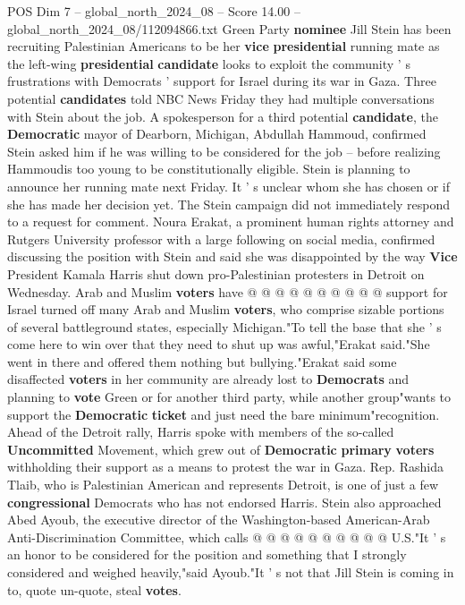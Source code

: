 \begin{textsample}{POS Dim 7 – global\_north\_2024\_08 – Score 14.00 – global\_north\_2024\_08/112094866.txt}  \label{ex:f7_pos_005}
Green Party \textbf{nominee} Jill Stein has been recruiting Palestinian Americans to be her \textbf{vice} \textbf{presidential} running mate as the left-wing \textbf{presidential} \textbf{candidate} looks to exploit the community ' s frustrations with Democrats ' support for Israel during its war in Gaza.
Three potential \textbf{candidates} told NBC News Friday they had multiple conversations with Stein about the job.
A spokesperson for a third potential \textbf{candidate}, the \textbf{Democratic} mayor of Dearborn, Michigan, Abdullah Hammoud, confirmed Stein asked him if he was willing to be considered for the job -- before realizing Hammoudis too young to be constitutionally eligible.
Stein is planning to announce her running mate next Friday.
It ' s unclear whom she has chosen or if she has made her decision yet.
The Stein campaign did not immediately respond to a request for comment.
Noura Erakat, a prominent human rights attorney and Rutgers University professor with a large following on social media, confirmed discussing the position with Stein and said she was disappointed by the way \textbf{Vice} President Kamala Harris shut down pro-Palestinian protesters in Detroit on Wednesday.
Arab and Muslim \textbf{voters} have @ @ @ @ @ @ @ @ @ @ support for Israel turned off many Arab and Muslim \textbf{voters}, who comprise sizable portions of several battleground states, especially Michigan."To tell the base that she ' s come here to win over that they need to shut up was awful,"Erakat said."She went in there and offered them nothing but bullying."Erakat said some disaffected \textbf{voters} in her community are already lost to \textbf{Democrats} and planning to \textbf{vote} Green or for another third party, while another group"wants to support the \textbf{Democratic} \textbf{ticket} and just need the bare minimum"recognition.
Ahead of the Detroit rally, Harris spoke with members of the so-called \textbf{Uncommitted} Movement, which grew out of \textbf{Democratic} \textbf{primary} \textbf{voters} withholding their support as a means to protest the war in Gaza.
Rep.
Rashida Tlaib, who is Palestinian American and represents Detroit, is one of just a few \textbf{congressional} Democrats who has not endorsed Harris.
Stein also approached Abed Ayoub, the executive director of the Washington-based American-Arab Anti-Discrimination Committee, which calls @ @ @ @ @ @ @ @ @ @ U.S."It ' s an honor to be considered for the position and something that I strongly considered and weighed heavily,"said Ayoub."It ' s not that Jill Stein is coming in to, quote un-quote, steal \textbf{votes}.

\end{textsample}
